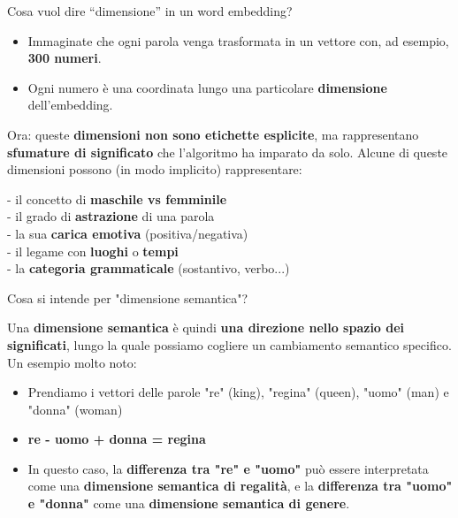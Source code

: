 \documentclass[aspectratio=169]{beamer}
\begin{document}
%
%
\begin{frame}{Cosa vuol dire “dimensione” in un word embedding?}
\begin{itemize}
\item Immaginate che ogni parola venga trasformata in un vettore con, ad esempio, \textbf{300 numeri}. 
\item Ogni numero è una coordinata lungo una particolare \textbf{dimensione} dell'embedding.
\end{itemize}
\vspace{0.3cm}
\small
Ora: queste \textbf{dimensioni non sono etichette esplicite}, ma rappresentano \textbf{sfumature di significato} che l'algoritmo ha imparato da solo. Alcune di queste dimensioni possono (in modo implicito) rappresentare:

- il concetto di \textbf{maschile vs femminile}\\
- il grado di \textbf{astrazione} di una parola\\
- la sua \textbf{carica emotiva} (positiva/negativa)\\
- il legame con \textbf{luoghi} o \textbf{tempi}\\
- la \textbf{categoria grammaticale} (sostantivo, verbo...)\\

\end{frame}
%
%
\begin{frame}{Cosa si intende per "dimensione semantica"?}

Una \textbf{dimensione semantica} è quindi \textbf{una direzione nello spazio dei significati}, lungo la quale possiamo cogliere un cambiamento semantico specifico.\\

Un esempio molto noto:
\begin{itemize}
\item Prendiamo i vettori delle parole "re" (king), "regina" (queen), "uomo" (man) e "donna" (woman)
\item \textbf{re - uomo + donna = regina}
\item In questo caso, la \textbf{differenza tra "re" e "uomo"} può essere interpretata come una \textbf{dimensione semantica di regalità}, e la \textbf{differenza tra "uomo" e "donna"} come una \textbf{dimensione semantica di genere}.
\end{itemize}
\end{frame}
%
\end{document}
